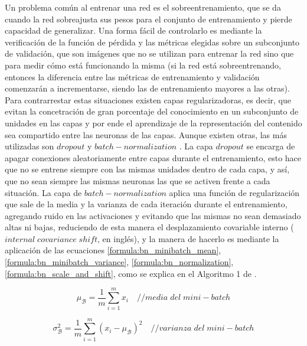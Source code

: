  Un problema común al entrenar una red es el sobreentrenamiento, que se da cuando la red sobreajusta sus pesos para el conjunto de entrenamiento y pierde capacidad de generalizar. Una forma fácil de controlarlo es mediante la verificación de la función de pérdida y las métricas elegidas sobre un subconjunto de validación, que son imágenes que no se utilizan para entrenar la red sino que para medir cómo está funcionando la misma (si la red está sobreentrenando, entonces la diferencia entre las métricas de entrenamiento y validación comenzarán a incrementarse, siendo las de entrenamiento mayores a las otras). Para contrarrestar estas situaciones existen capas regularizadoras, es decir, que evitan la concetración de gran porcentaje del conocimiento en un subconjunto de unidades en las capas y por ende el aprendizaje de la representación del contenido sea compartido entre las neuronas de las capas. Aunque existen otras, las más utilizadas son \(dropout\) y \(batch-normalization\) \cite{BatchNorm}. La capa \(dropout\) se encarga de apagar conexiones aleatoriamente entre capas durante el entrenamiento, esto hace que no se entrene siempre con las mismas unidades dentro de cada capa, y así, que no sean siempre las mismas neuronas las que se activen frente a cada situación. La capa de \(batch-normalization\) aplica una función de regularización que sale de la media y la varianza de cada iteración durante el entrenamiento, agregando ruido en las activaciones y evitando que las mismas no sean demasiado altas ni bajas, reduciendo de esta manera el desplazamiento covariable interno (\(internal\;covariance\; shift\), en inglés), y la manera de hacerlo es mediante la aplicación de las ecuaciones \ref{formula:bn_minibatch_mean}, \ref{formula:bn_minibatch_variance}, \ref{formula:bn_normalization}, \ref{formula:bn_scale_and_shift}, como se explica en el Algoritmo 1 de \cite{BatchNorm}.
 
 
 \begin{equation}\label{formula:bn_minibatch_mean}
 \mu_{\mathcal{B}} = \frac{1}{m} \sum_{i=1}^{m} x_{i}
\quad { // media\; del \; mini-batch}
 \end{equation}
 
 \begin{equation}\label{formula:bn_minibatch_variance}
 \sigma_{\mathcal{B}}^{2} = \frac{1}{m} \sum_{i=1}^{m}\left(x_{i}-\mu_{\mathcal{B}}\right)^{2}
\quad { // varianza \; del \; mini-batch}
 \end{equation}
 
